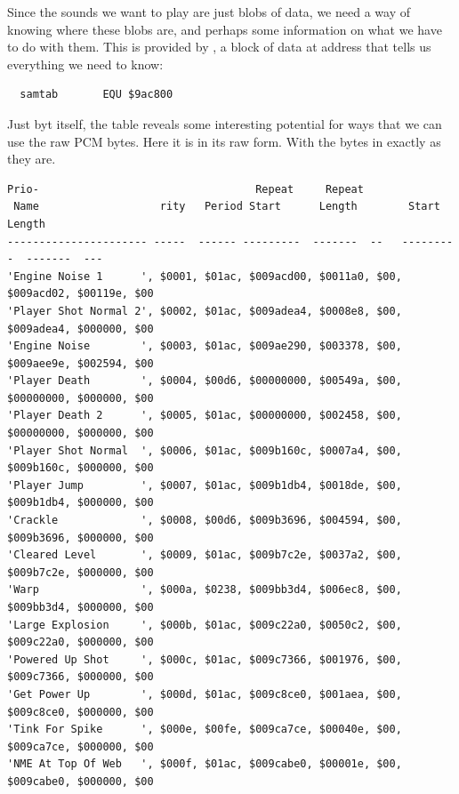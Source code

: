 Since the sounds we want to play are just blobs of data, we need a way of knowing where these blobs are, and perhaps
some information on what we have to do with them. This is provided by , a block of data at address
 that tells us everything we need to know:

\begin{lstlisting}
  samtab       EQU $9ac800
\end{lstlisting}

Just byt itself, the  table reveals some interesting potential for ways that we can use the
raw PCM bytes. Here it is in its raw form. With the bytes in  exactly as they are. 

\begin{lstlisting}[basicstyle=\scriptsize\ttfamily]
                        Prio-                                  Repeat     Repeat
 Name                   rity   Period Start      Length        Start      Length      
---------------------- -----  ------ ---------  -------  --   ---------  -------  ---
'Engine Noise 1      ', $0001, $01ac, $009acd00, $0011a0, $00, $009acd02, $00119e, $00
'Player Shot Normal 2', $0002, $01ac, $009adea4, $0008e8, $00, $009adea4, $000000, $00
'Engine Noise        ', $0003, $01ac, $009ae290, $003378, $00, $009aee9e, $002594, $00
'Player Death        ', $0004, $00d6, $00000000, $00549a, $00, $00000000, $000000, $00
'Player Death 2      ', $0005, $01ac, $00000000, $002458, $00, $00000000, $000000, $00
'Player Shot Normal  ', $0006, $01ac, $009b160c, $0007a4, $00, $009b160c, $000000, $00
'Player Jump         ', $0007, $01ac, $009b1db4, $0018de, $00, $009b1db4, $000000, $00
'Crackle             ', $0008, $00d6, $009b3696, $004594, $00, $009b3696, $000000, $00
'Cleared Level       ', $0009, $01ac, $009b7c2e, $0037a2, $00, $009b7c2e, $000000, $00
'Warp                ', $000a, $0238, $009bb3d4, $006ec8, $00, $009bb3d4, $000000, $00
'Large Explosion     ', $000b, $01ac, $009c22a0, $0050c2, $00, $009c22a0, $000000, $00
'Powered Up Shot     ', $000c, $01ac, $009c7366, $001976, $00, $009c7366, $000000, $00
'Get Power Up        ', $000d, $01ac, $009c8ce0, $001aea, $00, $009c8ce0, $000000, $00
'Tink For Spike      ', $000e, $00fe, $009ca7ce, $00040e, $00, $009ca7ce, $000000, $00
'NME At Top Of Web   ', $000f, $01ac, $009cabe0, $00001e, $00, $009cabe0, $000000, $00
\end{lstlisting}
